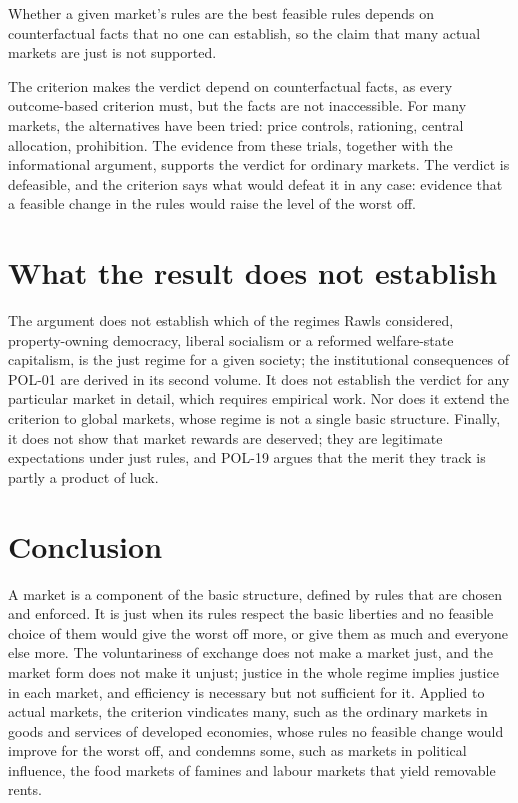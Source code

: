 \documentclass{situationist-preprint}
\begin{document}
\begin{objection}
Whether a given market's rules are the best feasible rules depends on counterfactual facts that no one can establish, so the claim that many actual markets are just is not supported.
\end{objection}

\begin{reply}
The criterion makes the verdict depend on counterfactual facts, as every outcome-based criterion must, but the facts are not inaccessible. For many markets, the alternatives have been tried: price controls, rationing, central allocation, prohibition. The evidence from these trials, together with the informational argument, supports the verdict for ordinary markets. The verdict is defeasible, and the criterion says what would defeat it in any case: evidence that a feasible change in the rules would raise the level of the worst off.
\end{reply}

\section{What the result does not establish}

The argument does not establish which of the regimes Rawls considered, property-owning democracy, liberal socialism or a reformed welfare-state capitalism, is the just regime for a given society; the institutional consequences of POL-01 are derived in its second volume. It does not establish the verdict for any particular market in detail, which requires empirical work. Nor does it extend the criterion to global markets, whose regime is not a single basic structure. Finally, it does not show that market rewards are deserved; they are legitimate expectations under just rules, and POL-19 argues that the merit they track is partly a product of luck.

\section{Conclusion}

A market is a component of the basic structure, defined by rules that are chosen and enforced. It is just when its rules respect the basic liberties and no feasible choice of them would give the worst off more, or give them as much and everyone else more. The voluntariness of exchange does not make a market just, and the market form does not make it unjust; justice in the whole regime implies justice in each market, and efficiency is necessary but not sufficient for it. Applied to actual markets, the criterion vindicates many, such as the ordinary markets in goods and services of developed economies, whose rules no feasible change would improve for the worst off, and condemns some, such as markets in political influence, the food markets of famines and labour markets that yield removable rents.
\end{document}
